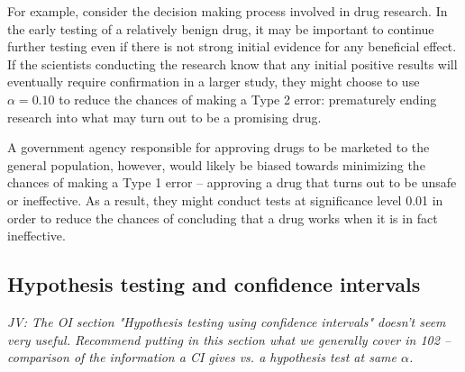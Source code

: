 \begin{spacing}{1.5}
For example, consider the decision making process involved in drug research. In the early testing of a relatively benign drug, it may be important to continue further testing even if there is not strong initial evidence for any beneficial effect. If the scientists conducting the research know that any initial positive results will eventually require confirmation in a larger study, they might choose to use $\alpha = 0.10$ to reduce the chances of making a Type 2 error: prematurely ending research into what may turn out to be a promising drug. 

A government agency responsible for approving drugs to be marketed to the general population, however, would likely be biased towards minimizing the chances of making a Type 1 error -- approving a drug that turns out to be unsafe or ineffective. As a result, they might conduct tests at significance level 0.01 in order to reduce the chances of concluding that a drug works when it is in fact ineffective. 


\subsection{Hypothesis testing and confidence intervals}

\textit{JV: The OI section "Hypothesis testing using confidence intervals" doesn't seem very useful. Recommend putting in this section what we generally cover in 102 -- comparison of the information a CI gives vs. a hypothesis test at same $\alpha$.}

\vspace{3cm}

\end{spacing}
